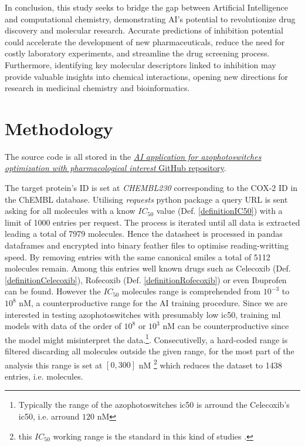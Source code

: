 \documentclass[11pt]{article}
\begin{document}
In conclusion, this study seeks to bridge the gap between Artificial Intelligence and computational chemistry, demonstrating AI’s potential to revolutionize drug discovery and molecular research. Accurate predictions of inhibition potential could accelerate the development of new pharmaceuticals, reduce the need for costly laboratory experiments, and streamline the drug screening process. Furthermore, identifying key molecular descriptors linked to inhibition may provide valuable insights into chemical interactions, opening new directions for research in medicinal chemistry and bioinformatics.

\newpage
\section{Methodology}\label{sectionMethodology}
The source code is all stored in the \href{https://github.com/SirSergi0/Repository---AI-application-for-azophotoswitches-optimization-with-pharmacological-interest}{\emph{AI application for azophotoswitches optimization with pharmacological interest} GitHub repository}\cite{GitHub}.

The target protein's ID is set at \emph{CHEMBL230} corresponding to the COX-2 ID in the ChEMBL database\cite{ChemblDatabase}. Utilising \emph{requests} python package\cite{PythonPackageRequests} a query URL is sent asking for all molecules with a know $IC_{50}$ value (Def. \ref{definitionIC50}) with a limit of 1000 entries per request. The process is iterated until all data is extracted leading a total of 7979 molecules. Hence the datasheet is processed in pandas dataframes\cite{PythonPackagePandas} and encrypted into binary feather files to optimise reading-writting speed. By removing entries with the same canonical smiles a total of 5112 molecules remain. Among this entries well known drugs such as Celecoxib (Def. \ref{definitionCelecoxib}), Rofecoxib (Def. \ref{definitionRofecoxib}) or even Ibuprofen can be found. However the $IC_{50}$ molecules range is comprehended from $10^{-3}$ to $10^{8}$ nM, a counterproductive range for the AI training procedure. Since we are interested in testing azophotoswitches with presumably low \gls{ic50}, training \gls{ml} models with data of the order of $10^{8}$ or $10^{3}$ nM can be counterproductive since the model might misinterpret the data.\footnote{Typically the range of the azophotoswitches \gls{ic50} is arround the Celecoxib's \gls{ic50}, i.e. arround $120$ nM}. Consecutivelly, a hard-coded range is filtered discarding all molecules outside the given range, for the most part of the analysis this range is set at $[0,300]$ nM \footnote{this $IC_{50}$ working range is the standard in this kind of studies \cite{MachineLearningPaper5Lipoxygenase}.} which reduces the dataset to 1438 entries, i.e. molecules.
\end{document}
